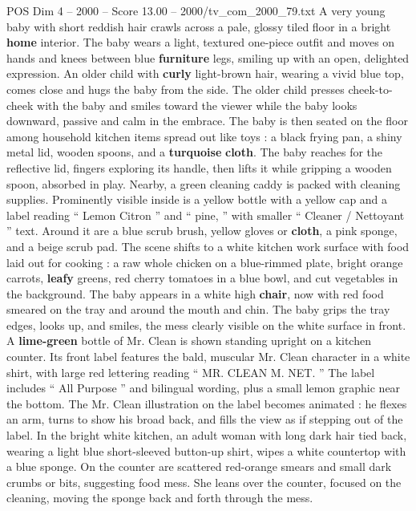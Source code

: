 \begin{textsample}{POS Dim 4 – 2000 – Score 13.00 – 2000/tv\_com\_2000\_79.txt}  \label{ex:f4_pos_058}
A very young baby with short reddish hair crawls across a pale, glossy tiled floor in a bright \textbf{home} interior.
The baby wears a light, textured one-piece outfit and moves on hands and knees between blue \textbf{furniture} legs, smiling up with an open, delighted expression.
An older child with \textbf{curly} light-brown hair, wearing a vivid blue top, comes close and hugs the baby from the side.
The older child presses cheek-to-cheek with the baby and smiles toward the viewer while the baby looks downward, passive and calm in the embrace.
The baby is then seated on the floor among household kitchen items spread out like toys : a black frying pan, a shiny metal lid, wooden spoons, and a \textbf{turquoise} \textbf{cloth}.
The baby reaches for the reflective lid, fingers exploring its handle, then lifts it while gripping a wooden spoon, absorbed in play.
Nearby, a green cleaning caddy is packed with cleaning supplies.
Prominently visible inside is a yellow bottle with a yellow cap and a label reading “ Lemon Citron ” and “ pine, ” with smaller “ Cleaner / Nettoyant ” text.
Around it are a blue scrub brush, yellow gloves or \textbf{cloth}, a pink sponge, and a beige scrub pad.
The scene shifts to a white kitchen work surface with food laid out for cooking : a raw whole chicken on a blue-rimmed plate, bright orange carrots, \textbf{leafy} greens, red cherry tomatoes in a blue bowl, and cut vegetables in the background.
The baby appears in a white high \textbf{chair}, now with red food smeared on the tray and around the mouth and chin.
The baby grips the tray edges, looks up, and smiles, the mess clearly visible on the white surface in front.
A \textbf{lime-green} bottle of Mr.
Clean is shown standing upright on a kitchen counter.
Its front label features the bald, muscular Mr.
Clean character in a white shirt, with large red lettering reading “ MR.
CLEAN M.
NET. ” The label includes “ All Purpose ” and bilingual wording, plus a small lemon graphic near the bottom.
The Mr.
Clean illustration on the label becomes animated : he flexes an arm, turns to show his broad back, and fills the view as if stepping out of the label.
In the bright white kitchen, an adult woman with long dark hair tied back, wearing a light blue short-sleeved button-up shirt, wipes a white countertop with a blue sponge.
On the counter are scattered red-orange smears and small dark crumbs or bits, suggesting food mess.
She leans over the counter, focused on the cleaning, moving the sponge back and forth through the mess.

\end{textsample}
